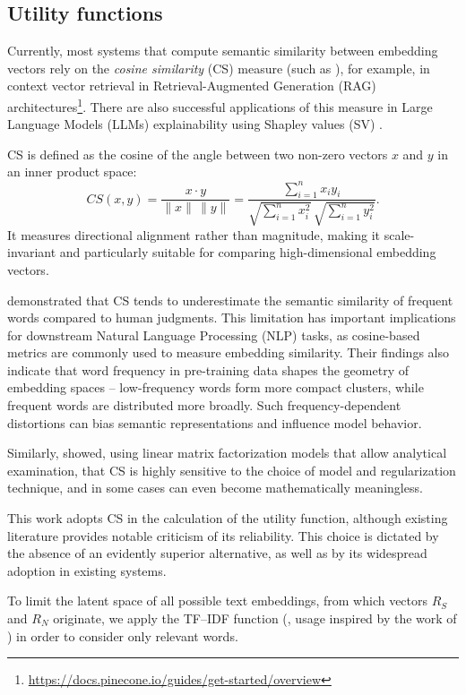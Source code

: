 \subsection{Utility functions}
\label{subsec:shapley_values__utility_func}

Currently, most systems that compute semantic similarity between embedding vectors rely on the \textit{cosine similarity} (CS) measure (such as \cite{reimers}), for example, in context vector retrieval in Retrieval-Augmented Generation (RAG) architectures\footnote{\url{https://docs.pinecone.io/guides/get-started/overview}}. There are also successful applications of this measure in Large Language Models (LLMs) explainability using Shapley values (SV) \parencite{goldshmidt2024tokenshapinterpretinglargelanguage}.

CS is defined as the cosine of the angle between two non-zero vectors $x$ and $y$ in an inner product space:
\[
CS(x, y) = \frac{x \cdot y}{\|x\| \, \|y\|} = \frac{\sum_{i=1}^{n} x_i y_i}{\sqrt{\sum_{i=1}^{n} x_i^2} \, \sqrt{\sum_{i=1}^{n} y_i^2}}.
\]
It measures directional alignment rather than magnitude, making it scale-invariant and particularly suitable for comparing high-dimensional embedding vectors.

\textcite{zhou-etal-2022-problems} demonstrated that CS tends to underestimate the semantic similarity of frequent words compared to human judgments. This limitation has important implications for downstream Natural Language Processing (NLP) tasks, as cosine-based metrics are commonly used to measure embedding similarity. Their findings also indicate that word frequency in pre-training data shapes the geometry of embedding spaces -- low-frequency words form more compact clusters, while frequent words are distributed more broadly. Such frequency-dependent distortions can bias semantic representations and influence model behavior.

Similarly, \textcite{Steck_2024} showed, using linear matrix factorization models that allow analytical examination, that CS is highly sensitive to the choice of model and regularization technique, and in some cases can even become mathematically meaningless.

This work adopts CS in the calculation of the utility function, although existing literature provides notable criticism of its reliability. This choice is dictated by the absence of an evidently superior alternative, as well as by its widespread adoption in existing systems.

To limit the latent space of all possible text embeddings, from which vectors $R_S$ and $R_N$ originate, we apply the TF–IDF function (\cite{tfidf-wikipedia}, usage inspired by the work of \textcite{goldshmidt2024tokenshapinterpretinglargelanguage}) in order to consider only relevant words.

